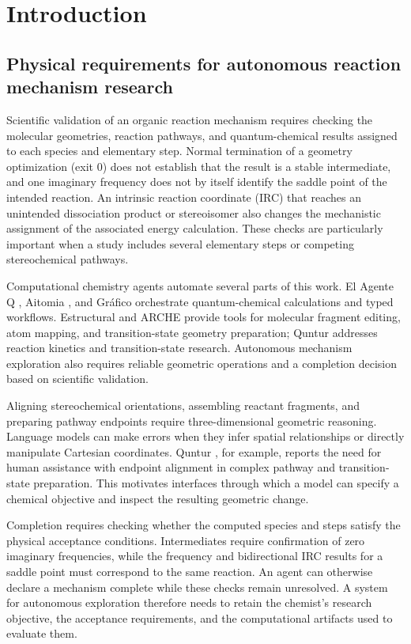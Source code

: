 \section{Introduction}

\subsection{Physical requirements for autonomous reaction mechanism research}

Scientific validation of an organic reaction mechanism requires checking the molecular geometries, reaction pathways, and quantum-chemical results assigned to each species and elementary step. Normal termination of a geometry optimization (exit 0) does not establish that the result is a stable intermediate, and one imaginary frequency does not by itself identify the saddle point of the intended reaction. An intrinsic reaction coordinate (IRC) that reaches an unintended dissociation product or stereoisomer also changes the mechanistic assignment of the associated energy calculation. These checks are particularly important when a study includes several elementary steps or competing stereochemical pathways.\citep{ref09,ref10}

Computational chemistry agents automate several parts of this work. El Agente Q \citep{ref01}, Aitomia \citep{ref02}, and Gráfico \citep{ref06} orchestrate quantum-chemical calculations and typed workflows. Estructural \citep{ref04} and ARCHE \citep{ref05} provide tools for molecular fragment editing, atom mapping, and transition-state geometry preparation; Quntur \citep{ref03} addresses reaction kinetics and transition-state research. Autonomous mechanism exploration also requires reliable geometric operations and a completion decision based on scientific validation.

Aligning stereochemical orientations, assembling reactant fragments, and preparing pathway endpoints require three-dimensional geometric reasoning. Language models can make errors when they infer spatial relationships or directly manipulate Cartesian coordinates. Quntur \citep{ref03}, for example, reports the need for human assistance with endpoint alignment in complex pathway and transition-state preparation. This motivates interfaces through which a model can specify a chemical objective and inspect the resulting geometric change.

Completion requires checking whether the computed species and steps satisfy the physical acceptance conditions. Intermediates require confirmation of zero imaginary frequencies, while the frequency and bidirectional IRC results for a saddle point must correspond to the same reaction. An agent can otherwise declare a mechanism complete while these checks remain unresolved. A system for autonomous exploration therefore needs to retain the chemist's research objective, the acceptance requirements, and the computational artifacts used to evaluate them.

